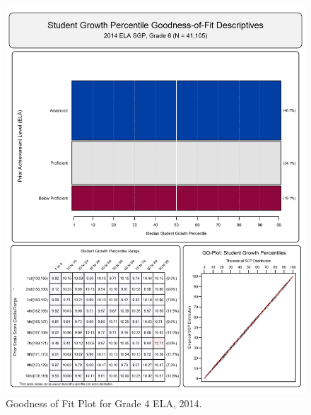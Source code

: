 \documentclass[12pt]{article}
\begin{document}
\begin{figure}[htbp]
\centering
\includegraphics{../img/Goodness_of_Fit/ELA.2014/2014_ELA_6;2013_ELA_5;2012_ELA_4;2011_ELA_3.png}
\caption{Goodness of Fit Plot for Grade 4 ELA, 2014.}
\end{figure}
\end{document}
